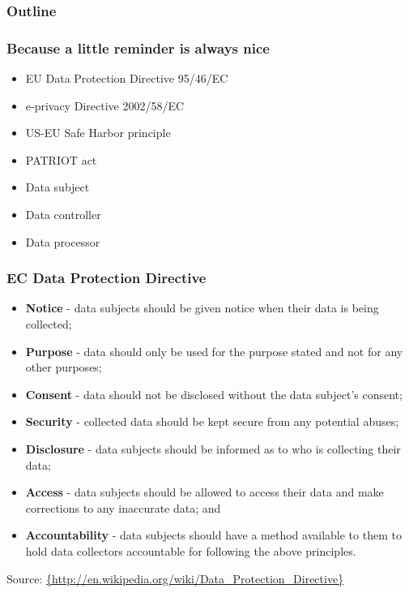 \documentclass{beamer}
\begin{document}
\begin{frame}
  \frametitle{Outline}
\end{frame}

\begin{frame}
    \frametitle{Because a little reminder is always nice}
    \begin{itemize}
        \item EU Data Protection Directive 95/46/EC
        \item e-privacy Directive 2002/58/EC %
        \item US-EU Safe Harbor principle
        \item PATRIOT act
    \end{itemize}

    \begin{itemize}
        \item Data subject
        \item Data controller \checkmark
        \item Data processor \checkmark
    \end{itemize}
\end{frame}

\begin{frame}
    \frametitle{EC Data Protection Directive}
    \begin{scriptsize}
    \begin{itemize}
        \item \textbf{Notice} - data subjects should be given notice when their data is being collected;
        \item \textbf{Purpose} - data should only be used for the purpose stated and not for any other purposes;
        \item \textbf{Consent} - data should not be disclosed without the data subject's consent;
        \item \textbf{Security} - collected data should be kept secure from any potential abuses;
        \item \textbf{Disclosure} - data subjects should be informed as to who is collecting their data;
        \item \textbf{Access} - data subjects should be allowed to access their data and make corrections to any inaccurate data; and
        \item \textbf{Accountability} - data subjects should have a method available to them to hold data collectors accountable for following the above principles.
    \end{itemize}
    \end{scriptsize}
    \footnotesize{Source: \url{{http://en.wikipedia.org/wiki/Data_Protection_Directive}}}
\end{frame}
\end{document}
